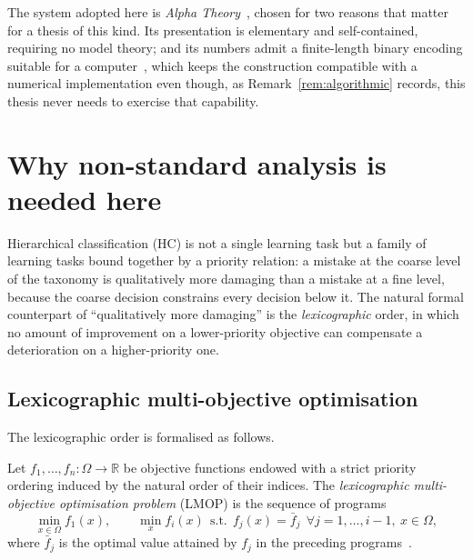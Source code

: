The system adopted here is \emph{Alpha
Theory}~\cite{benci2019measure,benci2022nonstandard}, chosen for two reasons that
matter for a thesis of this kind. Its presentation is elementary and self-contained,
requiring no model theory; and its numbers admit a finite-length binary encoding
suitable for a computer~\cite{benci2020algorithmic}, which keeps the construction
compatible with a numerical implementation even though, as
Remark~\ref{rem:algorithmic} records, this thesis never needs to exercise that
capability.

\section{Why non-standard analysis is needed here}
\label{sec:nsa-motivation}

Hierarchical classification (HC) is not a single learning task but a family of
learning tasks bound together by a priority relation: a mistake at the coarse level
of the taxonomy is qualitatively more damaging than a mistake at a fine level, because
the coarse decision constrains every decision below it. The natural formal counterpart
of ``qualitatively more damaging'' is the \emph{lexicographic} order, in which no
amount of improvement on a lower-priority objective can compensate a deterioration on
a higher-priority one.

\subsection{Lexicographic multi-objective optimisation}

The lexicographic order is formalised as follows.

\begin{definition}
\label{def:lmop}
Let $f_1,\dots,f_n : \Omega \to \mathbb{R}$ be objective functions endowed with a
strict priority ordering induced by the natural order of their indices. The
\emph{lexicographic multi-objective optimisation problem} (LMOP) is the sequence of
programs
\[
  \min_{x \in \Omega} f_1(x),
  \qquad
  \min_{x} f_i(x) \ \ \text{s.t.}\ \ f_j(x) = \bar{f}_j \ \ \forall j = 1,\dots,i-1,\ x \in \Omega,
\]
where $\bar{f}_j$ is the optimal value attained by $f_j$ in the preceding
programs~\cite{fiaschi2024informed}.
\end{definition}

